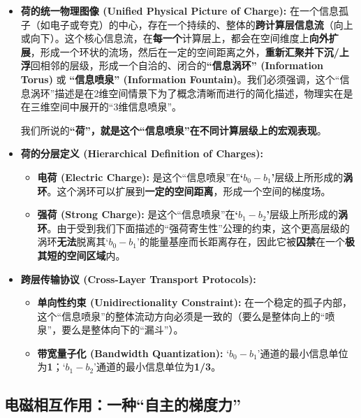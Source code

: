 \documentclass[12pt]{article}
\begin{document}
\begin{itemize}
    \item \textbf{荷的统一物理图像 (Unified Physical Picture of Charge):}  
    在一个信息孤子（如电子或夸克）的中心，存在一个持续的、整体的\textbf{跨计算层信息流}（向上或向下）。这个核心信息流，在\textbf{每一个}计算层上，都会在空间维度上\textbf{向外扩展}，形成一个环状的流场，然后在一定的空间距离之外，\textbf{重新汇聚并下沉/上浮}回相邻的层级，形成一个自洽的、闭合的\textbf{``信息涡环'' (Information Torus)} 或 \textbf{``信息喷泉'' (Information Fountain)}。我们必须强调，这个``信息涡环''描述是在2维空间情景下为了概念清晰而进行的简化描述，物理实在是在三维空间中展开的``3维信息喷泉''。  
    
    我们所说的\textbf{``荷''，就是这个``信息喷泉''在不同计算层级上的宏观表现}。
    
    \item \textbf{荷的分层定义 (Hierarchical Definition of Charges):}
    \begin{itemize}
        \item \textbf{电荷 (Electric Charge):} 是这个``信息喷泉''在\textbf{`$b_0-b_1$'}层级上所形成的\textbf{涡环}。这个涡环可以扩展到\textbf{一定的空间距离}，形成一个空间的梯度场。
    
        \item \textbf{强荷 (Strong Charge):} 是这个``信息喷泉''在\textbf{`$b_1-b_2$'}层级上所形成的\textbf{涡环}。由于受到我们下面描述的``强荷寄生性''公理的约束，这个更高层级的涡环\textbf{无法}脱离其`$b_0-b_1$'的能量基座而长距离存在，因此它被\textbf{囚禁}在一个\textbf{极其短的空间区域}内。
    \end{itemize}
    
    \item \textbf{跨层传输协议 (Cross-Layer Transport Protocols):}
    \begin{itemize}
        \item \textbf{单向性约束 (Unidirectionality Constraint):} 在一个稳定的孤子内部，这个``信息喷泉''的整体流动方向必须是一致的（要么是整体向上的``喷泉''，要么是整体向下的``漏斗''）。
        \item \textbf{带宽量子化 (Bandwidth Quantization):} `$b_0-b_1$'通道的最小信息单位为\textbf{1}；`$b_1-b_2$'通道的最小信息单位为\textbf{1/3}。
    \end{itemize}
\end{itemize}

\subsection{电磁相互作用：一种``自主的梯度力''}
\end{document}
